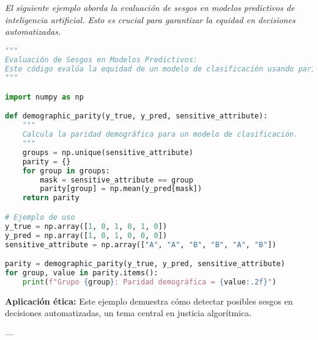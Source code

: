 \emph{El siguiente ejemplo aborda la evaluación de sesgos en modelos predictivos de inteligencia artificial. Esto es crucial para garantizar la equidad en decisiones automatizadas.}

\begin{lstlisting}[language=Python, caption={Evaluación de sesgos en modelos predictivos.}, label={lst:sesgo}]
"""
Evaluación de Sesgos en Modelos Predictivos:
Este código evalúa la equidad de un modelo de clasificación usando paridad demográfica.
"""

import numpy as np

def demographic_parity(y_true, y_pred, sensitive_attribute):
    """
    Calcula la paridad demográfica para un modelo de clasificación.
    """
    groups = np.unique(sensitive_attribute)
    parity = {}
    for group in groups:
        mask = sensitive_attribute == group
        parity[group] = np.mean(y_pred[mask])
    return parity

# Ejemplo de uso
y_true = np.array([1, 0, 1, 0, 1, 0])
y_pred = np.array([1, 0, 1, 0, 0, 0])
sensitive_attribute = np.array(["A", "A", "B", "B", "A", "B"])

parity = demographic_parity(y_true, y_pred, sensitive_attribute)
for group, value in parity.items():
    print(f"Grupo {group}: Paridad demográfica = {value:.2f}")
\end{lstlisting}

\textbf{Aplicación ética:} Este ejemplo demuestra cómo detectar posibles sesgos en decisiones automatizadas, un tema central en justicia algorítmica.

---

